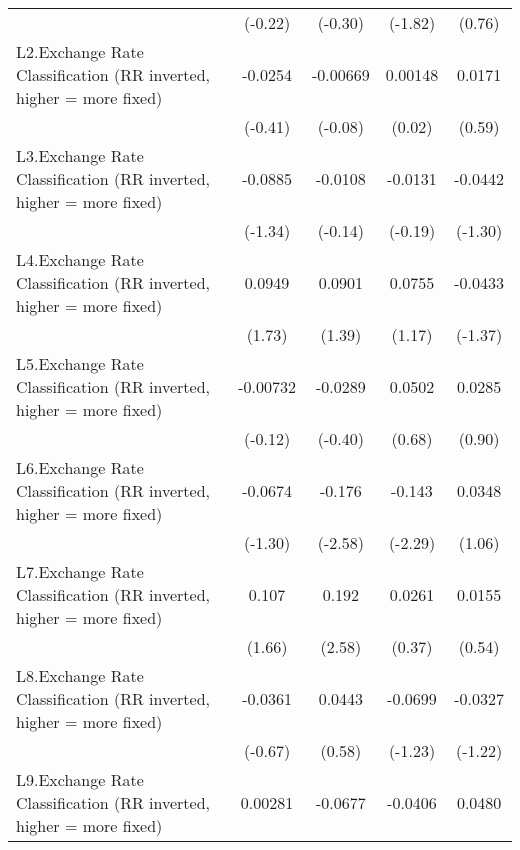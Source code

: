 {\begin{longtable}{l*{4}{c}}
                &  (-0.22)         &  (-0.30)         &  (-1.82)         &   (0.76)         \\
[1em]
L2.Exchange Rate Classification (RR inverted, higher = more fixed)&  -0.0254         & -0.00669         &  0.00148         &   0.0171         \\
                &  (-0.41)         &  (-0.08)         &   (0.02)         &   (0.59)         \\
[1em]
L3.Exchange Rate Classification (RR inverted, higher = more fixed)&  -0.0885         &  -0.0108         &  -0.0131         &  -0.0442         \\
                &  (-1.34)         &  (-0.14)         &  (-0.19)         &  (-1.30)         \\
[1em]
L4.Exchange Rate Classification (RR inverted, higher = more fixed)&   0.0949         &   0.0901         &   0.0755         &  -0.0433         \\
                &   (1.73)         &   (1.39)         &   (1.17)         &  (-1.37)         \\
[1em]
L5.Exchange Rate Classification (RR inverted, higher = more fixed)& -0.00732         &  -0.0289         &   0.0502         &   0.0285         \\
                &  (-0.12)         &  (-0.40)         &   (0.68)         &   (0.90)         \\
[1em]
L6.Exchange Rate Classification (RR inverted, higher = more fixed)&  -0.0674         &   -0.176\sym{**} &   -0.143\sym{*}  &   0.0348         \\
                &  (-1.30)         &  (-2.58)         &  (-2.29)         &   (1.06)         \\
[1em]
L7.Exchange Rate Classification (RR inverted, higher = more fixed)&    0.107         &    0.192\sym{**} &   0.0261         &   0.0155         \\
                &   (1.66)         &   (2.58)         &   (0.37)         &   (0.54)         \\
[1em]
L8.Exchange Rate Classification (RR inverted, higher = more fixed)&  -0.0361         &   0.0443         &  -0.0699         &  -0.0327         \\
                &  (-0.67)         &   (0.58)         &  (-1.23)         &  (-1.22)         \\
[1em]
L9.Exchange Rate Classification (RR inverted, higher = more fixed)&  0.00281         &  -0.0677         &  -0.0406         &   0.0480         \\

\end{longtable}}
